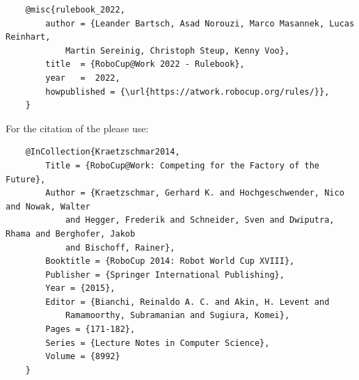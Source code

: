 \begin{titlepage}
\begin{minipage}{\textwidth}
\begin{verbatim}
	@misc{rulebook_2022,
		author = {Leander Bartsch, Asad Norouzi, Marco Masannek, Lucas Reinhart, 
			Martin Sereinig, Christoph Steup, Kenny Voo},
		title  = {RoboCup@Work 2022 - Rulebook},
		year   =  2022,
		howpublished = {\url{https://atwork.robocup.org/rules/}},
	}
\end{verbatim}


For the citation of the \RCAW please use:
\begin{verbatim}
	@InCollection{Kraetzschmar2014,
		Title = {RoboCup@Work: Competing for the Factory of the Future},
		Author = {Kraetzschmar, Gerhard K. and Hochgeschwender, Nico and Nowak, Walter
			and Hegger, Frederik and Schneider, Sven and Dwiputra, Rhama and Berghofer, Jakob
			and Bischoff, Rainer},
		Booktitle = {RoboCup 2014: Robot World Cup XVIII},
		Publisher = {Springer International Publishing},
		Year = {2015},
		Editor = {Bianchi, Reinaldo A. C. and Akin, H. Levent and
			Ramamoorthy, Subramanian and Sugiura, Komei},
		Pages = {171-182},
		Series = {Lecture Notes in Computer Science},
		Volume = {8992}
	}
\end{verbatim}
\end{minipage}




\end{titlepage}

